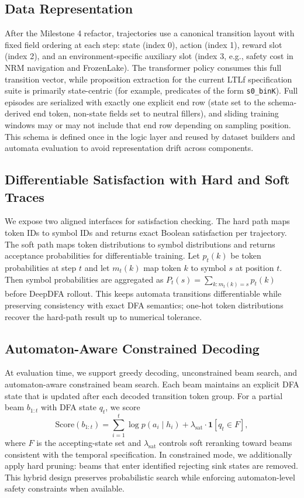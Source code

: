 \documentclass[runningheads]{llncs}
\begin{document}
\subsection{Data Representation}
After the Milestone 4 refactor, trajectories use a canonical transition layout with fixed field ordering at each step: state (index 0), action (index 1), reward slot (index 2), and an environment-specific auxiliary slot (index 3, e.g., safety cost in NRM navigation and FrozenLake). The transformer policy consumes this full transition vector, while proposition extraction for the current LTLf specification suite is primarily state-centric (for example, predicates of the form \texttt{s0\_binK}). Full episodes are serialized with exactly one explicit end row (state set to the schema-derived end token, non-state fields set to neutral fillers), and sliding training windows may or may not include that end row depending on sampling position. This schema is defined once in the logic layer and reused by dataset builders and automata evaluation to avoid representation drift across components.

\subsection{Differentiable Satisfaction with Hard and Soft Traces}
We expose two aligned interfaces for satisfaction checking. The hard path maps token IDs to symbol IDs and returns exact Boolean satisfaction per trajectory. The soft path maps token distributions to symbol distributions and returns acceptance probabilities for differentiable training. Let $p_t(k)$ be token probabilities at step $t$ and let $m_t(k)$ map token $k$ to symbol $s$ at position $t$. Then symbol probabilities are aggregated as $P_t(s)=\sum_{k:m_t(k)=s} p_t(k)$ before DeepDFA rollout. This keeps automata transitions differentiable while preserving consistency with exact DFA semantics; one-hot token distributions recover the hard-path result up to numerical tolerance.

\subsection{Automaton-Aware Constrained Decoding}
At evaluation time, we support greedy decoding, unconstrained beam search, and automaton-aware constrained beam search. Each beam maintains an explicit DFA state that is updated after each decoded transition token group. For a partial beam $b_{1:t}$ with DFA state $q_t$, we score
\begin{equation}
\mathrm{Score}(b_{1:t})=\sum_{i=1}^{t}\log p(a_i \mid h_i)+\lambda_{\mathrm{sat}} \cdot \mathbf{1}[q_t \in F],
\end{equation}
where $F$ is the accepting-state set and $\lambda_{\mathrm{sat}}$ controls soft reranking toward beams consistent with the temporal specification. In constrained mode, we additionally apply hard pruning: beams that enter identified rejecting sink states are removed. This hybrid design preserves probabilistic search while enforcing automaton-level safety constraints when available.
\end{document}
